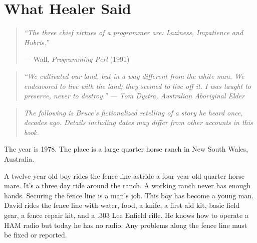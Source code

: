 

\chapter{What Healer Said}
\label{ch:t2-stories}
\label{pos05:the-stories}

\begin{quote}\small\textit{%
``The three chief virtues of a programmer are: Laziness, Impatience and Hubris.''%
}\par\raggedleft --- Wall, \textit{Programming Perl} (1991)\end{quote}

\vspace{0.3cm}

\begin{quote}\small\textit{%
``We cultivated our land, but in a way different from the white man. We endeavored to live with the land; they seemed to live off it. I was taught to preserve, never to destroy.'' --- Tom Dystra, Australian Aboriginal Elder
}\end{quote}

\begin{quote}\small\textit{%
The following is Bruce's fictionalized retelling of a story he heard once, decades ago.
Details including dates may differ from other accounts in this book.
}\end{quote}

\vspace{0.5cm}


The year is 1978.  The place is a large quarter horse ranch in New South Wales, Australia.

A twelve year old boy rides the fence line astride a four year old quarter horse mare.  It's a three day ride around the ranch.  A working ranch never has enough hands.  Securing the fence line is a man's job.  This boy has become a young man.  David rides the fence line with water, food, a knife, a first aid kit, basic field gear, a fence repair kit, and a .303 Lee Enfield rifle.  He knows how to operate a HAM radio but today he has no radio. Any problems along the fence line must be fixed or reported.

